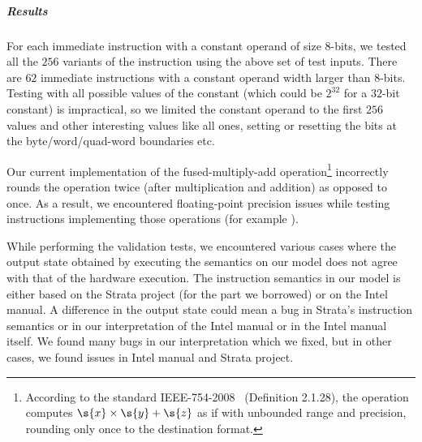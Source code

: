 
\subparagraph{Results}
For each immediate instruction with a constant operand of size $8$-bits, we 
tested all the $256$ variants of the instruction using the above set of test 
inputs. There are $62$ immediate instructions  with a constant operand width 
larger than $8$-bits.  Testing with all possible values of the constant (which 
could be $2^{32}$ for a $32$-bit constant) is impractical, so we limited the 
constant operand to the first $256$ values and other interesting values like  
all ones, setting or resetting the bits at the byte/word/quad-word boundaries 
etc.  

Our current implementation of the fused-multiply-add 
operation\footnote{According to the standard IEEE-754-2008~\cite{FP} 
(Definition 2.1.28), the operation  computes 
$\s{x} \times \s{y} + \s{z}$ as if with unbounded range and precision, rounding 
only once to the destination format.} incorrectly rounds the operation twice 
(after multiplication and addition) as opposed to once. As a result, we 
encountered floating-point precision issues while testing instructions 
implementing those operations (for example ).
 
 
While performing the validation tests, we encountered various cases where the output state obtained by executing the semantics on our model does not agree with that of the hardware execution. 
The instruction semantics in our model is either based on the Strata project (for the part we borrowed) or on the Intel manual. A difference in the output state could mean a bug in Strata's instruction semantics or in our interpretation of the Intel manual or in the Intel manual itself. We found many bugs in our interpretation which we fixed, but in other cases, we found issues  in Intel manual and Strata project.

